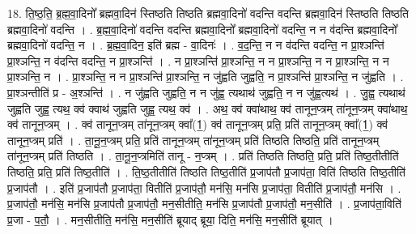 \documentclass[17pt]{extarticle}
\begin{document}
18. ति॒ष्ठ॒ति॒ ब्र॒ह्म॒वा॒दिनो᳚ ब्रह्मवा॒दिन॑ स्तिष्ठति तिष्ठति ब्रह्मवा॒दिनो॑ वदन्ति वदन्ति ब्रह्मवा॒दिन॑ स्तिष्ठति तिष्ठति ब्रह्मवा॒दिनो॑ वदन्ति । . ब्र॒ह्म॒वा॒दिनो॑ वदन्ति वदन्ति ब्रह्मवा॒दिनो᳚ ब्रह्मवा॒दिनो॑ वदन्ति॒ न न व॑दन्ति ब्रह्मवा॒दिनो᳚ ब्रह्मवा॒दिनो॑ वदन्ति॒ न । . ब्र॒ह्म॒वा॒दिन॒ इति॑ ब्रह्म - वा॒दिनः॑ । . व॒द॒न्ति॒ न न व॑दन्ति वदन्ति॒ न प्रा॒श्ञन्ति॑ प्रा॒श्ञन्ति॒ न व॑दन्ति वदन्ति॒ न प्रा॒श्ञन्ति॑ । . न प्रा॒श्ञन्ति॑ प्रा॒श्ञन्ति॒ न न प्रा॒श्ञन्ति॒ न न प्रा॒श्ञन्ति॒ न न प्रा॒श्ञन्ति॒ न । . प्रा॒श्ञन्ति॒ न न प्रा॒श्ञन्ति॑ प्रा॒श्ञन्ति॒ न जु॑ह्वति जुह्वति॒ न प्रा॒श्ञन्ति॑ प्रा॒श्ञन्ति॒ न जु॑ह्वति । . प्रा॒श्ञन्तीति॑ प्र - अ॒श्ञन्ति॑ । . न जु॑ह्वति जुह्वति॒ न न जु॑ह्व॒ त्यथाथ॑ जुह्वति॒ न न जु॑ह्व॒त्यथ॑ । . जु॒ह्व॒ त्यथाथ॑ जुह्वति जुह्व॒ त्यथ॒ क्व॑ क्वाथ॑ जुह्वति जुह्व॒ त्यथ॒ क्व॑ । . अथ॒ क्व॑ क्वा॑थाथ॒ क्व॑ तानून॒प्त्रम् ता॑नून॒प्त्रम् क्वा॑थाथ॒ क्व॑ तानून॒प्त्रम् । . क्व॑ तानून॒प्त्रम् ता॑नून॒प्त्रम् क्वा᳚(1॒) क्व॑ तानून॒प्त्रम् प्रति॒ प्रति॑ तानून॒प्त्रम् क्वा᳚(1॒) क्व॑ तानून॒प्त्रम् प्रति॑ । . ता॒नू॒न॒प्त्रम् प्रति॒ प्रति॑ तानून॒प्त्रम् ता॑नून॒प्त्रम् प्रति॑ तिष्ठति तिष्ठति॒ प्रति॑ तानून॒प्त्रम् ता॑नून॒प्त्रम् प्रति॑ तिष्ठति । . ता॒नू॒न॒प्त्रमिति॑ तानू - न॒प्त्रम् । . प्रति॑ तिष्ठति तिष्ठति॒ प्रति॒ प्रति॑ तिष्ठ॒तीतीति॑ तिष्ठति॒ प्रति॒ प्रति॑ तिष्ठ॒तीति॑ । . ति॒ष्ठ॒तीतीति॑ तिष्ठति तिष्ठ॒तीति॑ प्र॒जाप॑तौ प्र॒जाप॑ता॒ विति॑ तिष्ठति तिष्ठ॒तीति॑ प्र॒जाप॑तौ । . इति॑ प्र॒जाप॑तौ प्र॒जाप॑ता॒ वितीति॑ प्र॒जाप॑तौ॒ मन॑सि॒ मन॑सि प्र॒जाप॑ता॒ वितीति॑ प्र॒जाप॑तौ॒ मन॑सि । . प्र॒जाप॑तौ॒ मन॑सि॒ मन॑सि प्र॒जाप॑तौ प्र॒जाप॑तौ॒ मन॒सीतीति॒ मन॑सि प्र॒जाप॑तौ प्र॒जाप॑तौ॒ मन॒सीति॑ । . प्र॒जाप॑ता॒विति॑ प्र॒जा - प॒तौ॒ । . मन॒सीतीति॒ मन॑सि॒ मन॒सीति॑ ब्रूयाद् ब्रूया॒ दिति॒ मन॑सि॒ मन॒सीति॑ ब्रूयात् । \newline
\end{document}
